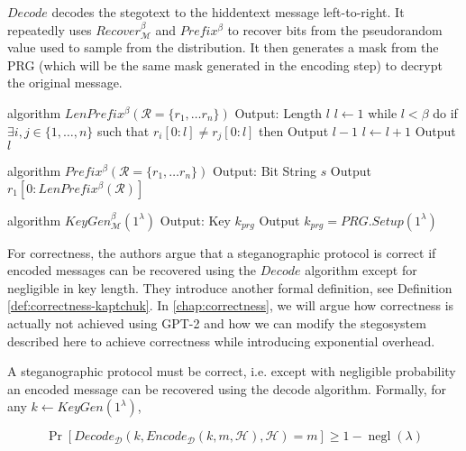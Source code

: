$Decode$ decodes the stegotext to the hiddentext message left-to-right. 
It repeatedly uses $Recover_{\mathcal{M}}^\beta$ and $Prefix^\beta$ to recover bits from the pseudorandom value used to sample from the distribution.
It then generates a mask from the PRG (which will be the same mask generated in the encoding step) to decrypt the original message.

\begin{Pseudocode}[float, caption={Meteor LenPrefix Algorithm}]
algorithm $LenPrefix^\beta(\mathcal R = \{ r_1, \dots r_n \})$
	Output: Length $l$
	$l \leftarrow 1$
	while $l < \beta$ do
		if $\exists i, j \in \{ 1, \dots, n \}$ such that $r_i[0: l] \neq r_j[0:	l]$ then
			Output $l-1$
		$l \leftarrow l+1$
	Output $l$
\end{Pseudocode}

\begin{Pseudocode}[float, caption={Meteor Prefix Algorithm}]
algorithm $Prefix^\beta(	\mathcal R = \{ r_1, \dots r_n \})$
	Output: Bit String $s$
	Output $r_1[0: LenPrefix^\beta(\mathcal{R})]$
\end{Pseudocode}

\begin{Pseudocode}[float, caption={Meteor KeyGen Algorithm}]
algorithm $KeyGen_{\mathcal{M}}^\beta(1^\lambda)$
	Output: Key $k_{prg}$
	Output $k_{prg} = PRG.Setup(1^\lambda)$
\end{Pseudocode}

For correctness, the authors argue that a steganographic protocol is correct if encoded messages can be recovered using the $Decode$ algorithm except for negligible in key length.
They introduce another formal definition, see Definition \ref{def:correctness-kaptchuk}.
In \autoref{chap:correctness}, we will argue how correctness is actually not achieved using GPT-2 and how we can modify the stegosystem described here to achieve correctness while introducing exponential overhead.

\begin{definition}
\label{def:correctness-kaptchuk}
A steganographic protocol must be correct, i.e. except with negligible probability an encoded message can be recovered using the decode algorithm. Formally, for any $k \leftarrow KeyGen(1^\lambda)$,

$$\mathop{Pr}[Decode_{\mathcal{D}}(k, Encode_{\mathcal{D}}(k, m, \mathcal{H}), \mathcal{H}) = m] \geq 1 - \mathop{negl}(\lambda)$$
\end{definition}

